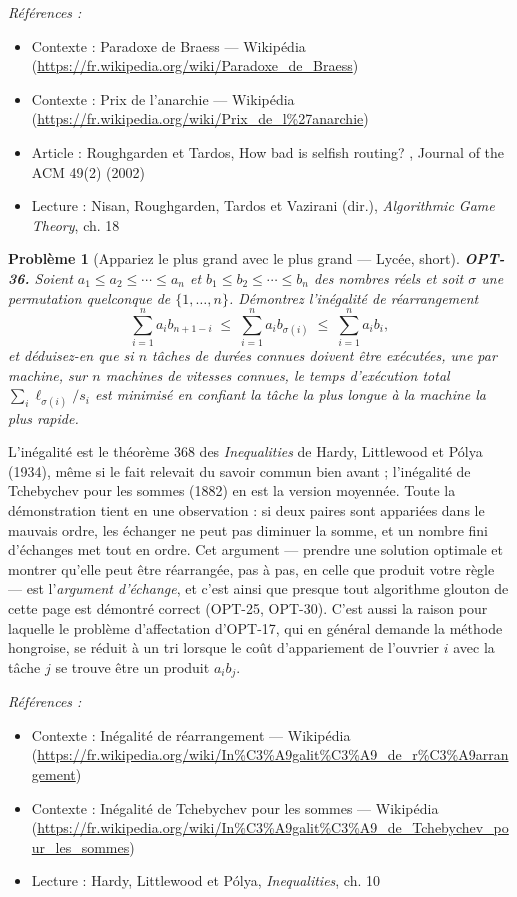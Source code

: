 \documentclass[11pt]{article}
\newtheorem{problem}{Problème}
\newenvironment{refs}{\par\small\noindent\emph{Références :}\begin{itemize}\setlength\itemsep{0pt}}{\end{itemize}\normalsize}
\begin{document}
\begin{refs}
\item Contexte : Paradoxe de Braess --- Wikipédia (\url{https://fr.wikipedia.org/wiki/Paradoxe_de_Braess})
\item Contexte : Prix de l'anarchie --- Wikipédia (\url{https://fr.wikipedia.org/wiki/Prix_de_l%27anarchie})
\item Article : Roughgarden et Tardos, \og{} How bad is selfish routing? \fg{}, Journal of the ACM 49(2) (2002)
\item Lecture : Nisan, Roughgarden, Tardos et Vazirani (dir.), \textit{Algorithmic Game Theory}, ch. 18
\end{refs}

\bigskip

\begin{problem}[{Appariez le plus grand avec le plus grand --- Lycée, short}]
\textbf{OPT-36.} Soient $a_1 \le a_2 \le \cdots \le a_n$ et $b_1 \le b_2 \le \cdots \le b_n$ des nombres réels et soit $\sigma$ une permutation quelconque de $\{1, \ldots, n\}$. Démontrez l'inégalité de réarrangement
\[ \sum_{i=1}^{n} a_i b_{n+1-i} \;\le\; \sum_{i=1}^{n} a_i b_{\sigma(i)} \;\le\; \sum_{i=1}^{n} a_i b_i , \]
et déduisez-en que si $n$ tâches de durées connues doivent être exécutées, une par machine, sur $n$ machines de vitesses connues, le temps d'exécution total $\sum_i \ell_{\sigma(i)}/s_i$ est minimisé en confiant la tâche la plus longue à la machine la plus rapide.
\end{problem}

\noindent L'inégalité est le théorème 368 des \textit{Inequalities} de Hardy, Littlewood et Pólya (1934), même si le fait relevait du savoir commun bien avant ; l'inégalité de Tchebychev pour les sommes (1882) en est la version moyennée. Toute la démonstration tient en une observation : si deux paires sont appariées dans le mauvais ordre, les échanger ne peut pas diminuer la somme, et un nombre fini d'échanges met tout en ordre. Cet argument --- prendre une solution optimale et montrer qu'elle peut être réarrangée, pas à pas, en celle que produit votre règle --- est l'\textit{argument d'échange}, et c'est ainsi que presque tout algorithme glouton de cette page est démontré correct (OPT-25, OPT-30). C'est aussi la raison pour laquelle le problème d'affectation d'OPT-17, qui en général demande la méthode hongroise, se réduit à un tri lorsque le coût d'appariement de l'ouvrier $i$ avec la tâche $j$ se trouve être un produit $a_i b_j$.

\begin{refs}
\item Contexte : Inégalité de réarrangement --- Wikipédia (\url{https://fr.wikipedia.org/wiki/In%C3%A9galit%C3%A9_de_r%C3%A9arrangement})
\item Contexte : Inégalité de Tchebychev pour les sommes --- Wikipédia (\url{https://fr.wikipedia.org/wiki/In%C3%A9galit%C3%A9_de_Tchebychev_pour_les_sommes})
\item Lecture : Hardy, Littlewood et Pólya, \textit{Inequalities}, ch. 10
\end{refs}
\end{document}
